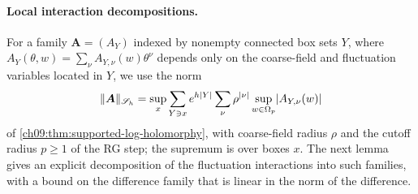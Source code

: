 \paragraph{Local interaction decompositions.}
For a family $\boldsymbol A=(A_Y)$ indexed by nonempty connected box sets $Y$, where $A_Y(\theta,w)=\sum_\nu A_{Y,\nu}(w)\theta^\nu$ depends only on the coarse-field and fluctuation variables located in $Y$, we use the norm
\begin{equation}\label{ch12:eq:supported-norm}
 \lVert \boldsymbol A\rVert_{\mathscr S_h}=\sup_x\sum_{Y\ni x}e^{h\lvert Y\rvert}\sum_\nu\rho^{\lvert \nu\rvert}\sup_{w\in\Omega_p}\lvert A_{Y,\nu}(w)\rvert
\end{equation}
of \cref{ch09:thm:supported-log-holomorphy}, with coarse-field radius $\rho$ and the cutoff radius $p\ge1$ of the RG step; the supremum is over boxes $x$. The next lemma gives an explicit decomposition of the fluctuation interactions into such families, with a bound on the difference family that is linear in the norm of the difference.

